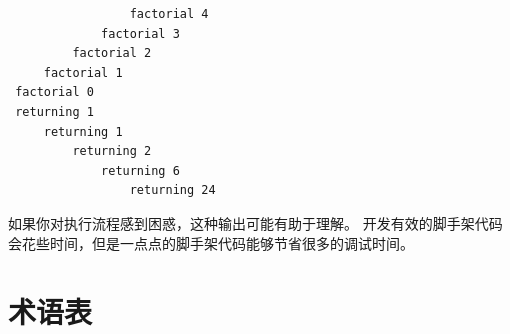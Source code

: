 \begin{lstlisting}
                 factorial 4
             factorial 3
         factorial 2
     factorial 1
 factorial 0
 returning 1
     returning 1
         returning 2
             returning 6
                 returning 24
\end{lstlisting}

%

如果你对执行流程感到困惑，这种输出可能有助于理解。
开发有效的脚手架代码会花些时间，但是一点点的脚手架代码能够节省很多的调试时间。

\section{术语表}

